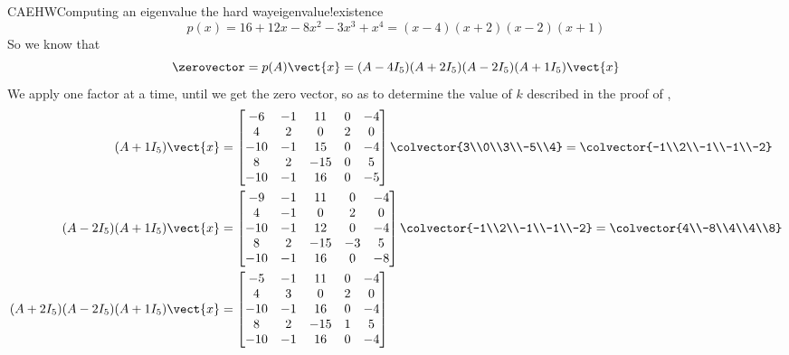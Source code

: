\begin{example}{CAEHW}{Computing an eigenvalue the hard way}{eigenvalue!existence}
%
\begin{equation*}
p(x)=16+12x-8x^2-3x^3+x^4=(x-4)(x+2)(x-2)(x+1)
\end{equation*}
%
So we know that
%
\begin{equation*}
\zerovector=p(A)\vect{x}=(A-4I_5)(A+2I_5)(A-2I_5)(A+1I_5)\vect{x}
\end{equation*}
%
We apply one factor at a time, until we get the zero vector, so as to determine the value of $k$ described in the proof of ,
%
\begin{align*}
(A+1I_5)\vect{x}&=
\begin{bmatrix}
-6 & -1 & 11 & 0 & -4\\
4 & 2 & 0 & 2 & 0\\
-10 & -1 & 15 & 0 & -4\\
8 & 2 & -15 & 0 & 5\\
-10 & -1 & 16 & 0 & -5
\end{bmatrix}
\colvector{3\\0\\3\\-5\\4}
=
\colvector{-1\\2\\-1\\-1\\-2}\\
%
(A-2I_5)(A+1I_5)\vect{x}&=
\begin{bmatrix}
-9 & -1 & 11 & 0 & -4\\
4 & -1 & 0 & 2 & 0\\
-10 & -1 & 12 & 0 & -4\\
8 & 2 & -15 & -3 & 5\\
-10 & -1 & 16 & 0 & -8
\end{bmatrix}
\colvector{-1\\2\\-1\\-1\\-2}
=
\colvector{4\\-8\\4\\4\\8}\\
%
(A+2I_5)(A-2I_5)(A+1I_5)\vect{x}&=
\begin{bmatrix}
-5 & -1 & 11 & 0 & -4\\
4 & 3 & 0 & 2 & 0\\
-10 & -1 & 16 & 0 & -4\\
8 & 2 & -15 & 1 & 5\\
-10 & -1 & 16 & 0 & -4

\end{bmatrix}
\end{align*}
\end{example}
